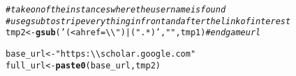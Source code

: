 \documentclass{article}\usepackage[]{graphicx}\usepackage[]{color}
\makeatletter
\newcommand{\hlstr}[1]{\textcolor[rgb]{0.192,0.494,0.8}{#1}}%
\newcommand{\hlcom}[1]{\textcolor[rgb]{0.678,0.584,0.686}{\textit{#1}}}%
\newcommand{\hlstd}[1]{\textcolor[rgb]{0.345,0.345,0.345}{#1}}%
\newcommand{\hlkwb}[1]{\textcolor[rgb]{0.69,0.353,0.396}{#1}}%
\newcommand{\hlkwd}[1]{\textcolor[rgb]{0.737,0.353,0.396}{\textbf{#1}}}%
\newenvironment{kframe}{%
 \def\at@end@of@kframe{}%
 \ifinner\ifhmode%
  \def\at@end@of@kframe{\end{minipage}}%
  \begin{minipage}{\columnwidth}%
 \fi\fi%
 \def\FrameCommand##1{\hskip\@totalleftmargin \hskip-\fboxsep
 \colorbox{shadecolor}{##1}\hskip-\fboxsep
     \hskip-\linewidth \hskip-\@totalleftmargin \hskip\columnwidth}%
 \MakeFramed {\advance\hsize-\width
   \@totalleftmargin\z@ \linewidth\hsize
   \@setminipage}}%
 {\par\unskip\endMakeFramed%
 \at@end@of@kframe}
\newenvironment{knitrout}{}{} %
\makeatother
\begin{document}
\begin{knitrout}
\begin{kframe}
\begin{alltt}
\hlcom{#take on of the instances where the username is found}
\hlcom{#use gsub to strip everything in front and after the link of interest}
\hlstd{tmp2}\hlkwb{<-}\hlkwd{gsub}\hlstd{(}\hlstr{'(<a href=\textbackslash{}\textbackslash{}")|(".*)'}\hlstd{,} \hlstr{""}\hlstd{, tmp1)} \hlcom{#end game url}
\end{alltt}


{\ttfamily\noindent\bfseries{}}\begin{alltt}
\hlstd{base_url}\hlkwb{<-}\hlstr{"https:\textbackslash{}\textbackslash{}scholar.google.com"}
\hlstd{full_url}\hlkwb{<-}\hlkwd{paste0}\hlstd{(base_url,tmp2)}
\end{alltt}


{\ttfamily\noindent\bfseries\color{errorcolor}{\#\# Error in paste0(base\_url, tmp2): object 'tmp2' not found}}\end{kframe}
\end{knitrout}
\end{document}

